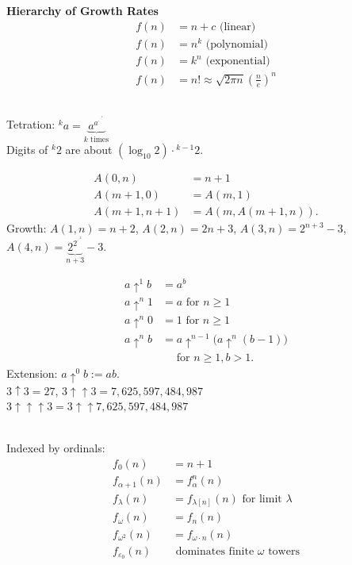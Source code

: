 \begin{technical}
{\Large\textbf{Hierarchy of Growth Rates}}\\[0.3em]

\begin{align*}
f(n) &= n + c \text{ (linear)}\\
f(n) &= n^k \text{ (polynomial)}\\
f(n) &= k^n \text{ (exponential)}\\
f(n) &= n! \approx \sqrt{2\pi n}\left(\frac{n}{e}\right)^n
\end{align*}

\\
Tetration: ${}^ka = \underbrace{a^{a^{\cdot^{\cdot^{\cdot^a}}}}}_{k \text{ times}}$\\
Digits of ${}^k2$ are about $(\log_{10}2) \cdot {}^{k-1}2$.

\begin{align*}
A(0,n) &= n+1\\
A(m+1,0) &= A(m,1)\\
A(m+1,n+1) &= A(m, A(m+1,n)).
\end{align*}
Growth: $A(1,n) = n+2$, $A(2,n) = 2n+3$, $A(3,n) = 2^{n+3}-3$, $A(4,n) = \underbrace{2^{2^{\cdot^{\cdot^{2}}}}}_{n+3} - 3$.

\begin{align*}
a\uparrow^{1}b &= a^b\\
a\uparrow^{n}1 &= a \text{ for } n\ge1\\
a\uparrow^{n}0 &= 1 \text{ for } n\ge1\\
a\uparrow^{n}b &= a\uparrow^{n-1}\big(a\uparrow^{n}(b-1)\big)\\
&\quad\text{ for } n\ge1, b>1.
\end{align*}
Extension: $a\uparrow^{0}b := ab$.\\
$3 \uparrow 3 = 27$, $3 \uparrow\uparrow 3 = 7{,}625{,}597{,}484{,}987$\\
$3 \uparrow\uparrow\uparrow 3 = 3 \uparrow\uparrow 7{,}625{,}597{,}484{,}987$

\\
Indexed by ordinals:
\begin{align*}
f_0(n) &= n+1\\
f_{\alpha+1}(n) &= f_\alpha^n(n)\\
f_\lambda(n) &= f_{\lambda[n]}(n) \text{ for limit } \lambda\\
f_\omega(n) &= f_n(n)\\
f_{\omega^2}(n) &= f_{\omega \cdot n}(n)\\
f_{\varepsilon_0}(n) &\text{ dominates finite } \omega \text{ towers}
\end{align*}


\end{technical}
